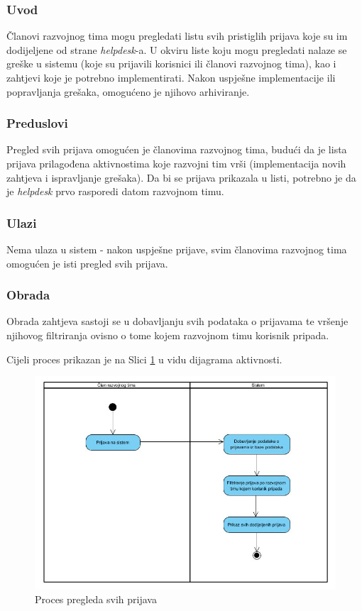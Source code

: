 \documentclass[12pt,a4paper]{article}
\begin{document}
\subsubsection{Uvod}

Članovi razvojnog tima mogu pregledati listu svih pristiglih prijava koje su im dodijeljene od strane \textit{helpdesk}-a. U okviru liste koju mogu pregledati nalaze se greške u sistemu (koje su prijavili korisnici ili članovi razvojnog tima), kao i zahtjevi koje je potrebno implementirati. Nakon uspješne implementacije ili popravljanja grešaka, omogućeno je njihovo arhiviranje.

\subsubsection{Preduslovi}

Pregled svih prijava omogućen je članovima razvojnog tima, budući da je lista prijava prilagođena aktivnostima koje razvojni tim vrši (implementacija novih zahtjeva i ispravljanje grešaka). Da bi se prijava prikazala u listi, potrebno je da je \textit{helpdesk} prvo rasporedi datom razvojnom timu.

\subsubsection{Ulazi}

Nema ulaza u sistem - nakon uspješne prijave, svim članovima razvojnog tima omogućen je isti pregled svih prijava.

\subsubsection{Obrada}

Obrada zahtjeva sastoji se u dobavljanju svih podataka o prijavama te vršenje njihovog filtriranja ovisno o tome kojem razvojnom timu korisnik pripada.

Cijeli proces prikazan je na Slici \ref{act5} u vidu dijagrama aktivnosti.

\begin{figure}[H]
\center
\includegraphics[scale=0.5]{../res/Activity/activity5.JPG}
\caption{Proces pregleda svih prijava}
\label{act5}
\end{figure}
\end{document}
